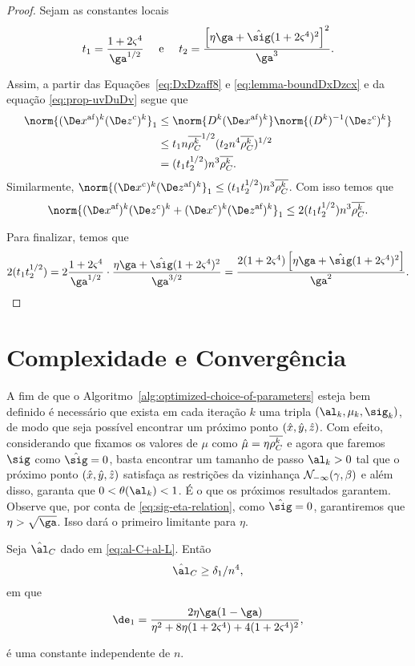 \begin{proof}  Sejam as constantes locais
\[
t_{1} = \frac{1 + 2\bdxzstar^{4} }{\ga^{1/2}} \quad \text{ e } \quad t_{2} = \dfrac{\left[\eta\ga + \nextsig(1+2\bdxzstar^{4})^{2}\right]^{2}}{\ga^{3}}.
\]
 
	 Assim, a partir  das Equações~\ref{eq:DxDzaff8} e \eqref{eq:lemma-boundDxDzcx} e da equação \eqref{eq:prop-uvDuDv} segue que  
	\[
	\begin{aligned}	
		\norm{ \dekx \Dekcoz}_{1} & \leq \norm{\Dk \dekx }\norm{\Dik\Dekcoz}\\
							  & \leq 	t_1 n\rhoCkb ^{1/2}(t_2 n^{4}\rhoCkb )^{1/2}  \\
							  & = (t_1t_2^{1/2})n^{3}\rhoCkb .
	\end{aligned}\]			  
Similarmente, 	$\norm{\Dekcox \dekz }_{1} \leq (t_1t_2^{1/2})n^{3}\rhoCkb $. Com isso temos  que 
\[
		\norm{ \dekx \Dekcoz + \Dekcox \dekz }_{1} \leq 2(t_1t_2^{1/2})n^{3}\rhoCkb .
\]

Para finalizar, temos que  
\[
2(t_1t_2^{1/2}) = 2\frac{1 + 2\bdxzstar^{4} }{\ga^{1/2}} \cdot \dfrac{\eta\ga + \nextsig(1+2\bdxzstar^{4})^{2}}{\ga^{3/2}} = \dfrac{2(1+2\bdxzstar^{4})\left[\eta\ga + \nextsig(1+2\bdxzstar^{4})^{2}\right]}{\ga^{2}}. \qedhere
\]
\end{proof}

\section{Complexidade e  Convergência}

A fim de que o Algoritmo~\ref{alg:optimized-choice-of-parameters} esteja bem definido é necessário que exista em cada iteração $k$ uma tripla $(\al_k,\mu_k,\sig_k)$, de modo que seja possível encontrar um próximo ponto $(\hat{x},\hat{y},\hat{z})$. Com efeito, considerando que fixamos os valores de $\mu$ como $\hat{\mu} = \eta\overline{\rho_C^{k}}$ e  agora que faremos $\sig$ como $\nextsig=0$, basta encontrar um  tamanho de passo ${\al_k}>0$ tal que o próximo ponto $(\hat{x},\hat{y},\hat{z})$ satisfaça as restrições da vizinhança 
$\mathcal{N}_{-\infty}(\gamma,\beta)$ e além disso, garanta que  $0 < \theta(\al_k) <1$. É o que os próximos resultados garantem. Observe que, por conta de \eqref{eq:sig-eta-relation}, como $\nextsig =0$, garantiremos que $\eta>\sqrt{\ga}$. Isso dará o primeiro limitante para $\eta$.



\begin{lema}\label{lemma:alC_delta-1}
Seja $\nextal_{C}$ dado em \eqref{eq:al-C+al-L}. Então  
\[
\nextal_{C} \geq \delta_{1}/n^{4},
\]
em que 
\begin{equation}
	\label{eq:delta1}
	\de_{1} = \dfrac{2\eta\ga(1-\ga)}{\eta^{2} + 8\eta (1+2\bdxzstar^{4}) + 4 (1+2\bdxzstar^{4})^{2}   },
\end{equation}

é uma constante independente de $n$.
\end{lema}

